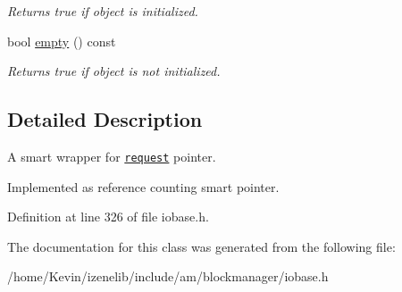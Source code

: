 \begin{CompactItemize}
\begin{CompactList}\small\item\em Returns true if object is initialized. \item\end{CompactList}\item 
\hypertarget{group__iolayer_g41b7141c1c672fac687ab81ce5438017}{
bool \hyperlink{group__iolayer_g41b7141c1c672fac687ab81ce5438017}{empty} () const }
\label{group__iolayer_g41b7141c1c672fac687ab81ce5438017}

\begin{CompactList}\small\item\em Returns true if object is not initialized. \item\end{CompactList}\end{CompactItemize}


\subsection{Detailed Description}
A smart wrapper for {\tt \hyperlink{classrequest}{request}} pointer. 

Implemented as reference counting smart pointer. 

Definition at line 326 of file iobase.h.

The documentation for this class was generated from the following file:\begin{CompactItemize}
\item 
/home/Kevin/izenelib/include/am/blockmanager/iobase.h\end{CompactItemize}
